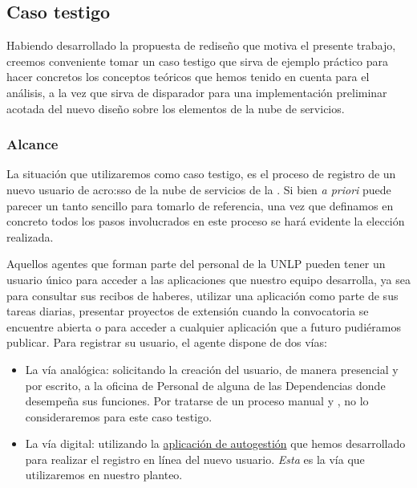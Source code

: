 \subsection{Caso testigo}
\label{caso-testigo}

Habiendo desarrollado la propuesta de rediseño que motiva el presente trabajo, creemos conveniente tomar un caso testigo que sirva de ejemplo práctico para hacer concretos los conceptos teóricos que hemos tenido en cuenta para el análisis, a la vez que sirva de disparador para una implementación preliminar acotada del nuevo diseño sobre los elementos de la nube de servicios.

\subsubsection{Alcance}

La situación que utilizaremos como caso testigo, es el proceso de registro de un nuevo usuario de \gls{acro:sso} de la nube de servicios de la {\unlp}. Si bien \textit{a priori} puede parecer un tanto sencillo para tomarlo de referencia, una vez que definamos en concreto todos los pasos involucrados en este proceso se hará evidente la elección realizada.

Aquellos agentes que forman parte del personal de la UNLP pueden tener un usuario único para acceder a las aplicaciones que nuestro equipo desarrolla, ya sea para consultar sus recibos de haberes, utilizar una aplicación como parte de sus tareas diarias, presentar proyectos de extensión cuando la convocatoria se encuentre abierta o para acceder a cualquier aplicación que a futuro pudiéramos publicar. Para registrar su usuario, el agente dispone de dos vías:

\begin{itemize}
  \item La vía analógica: solicitando la creación del usuario, de manera presencial y por escrito, a la oficina de Personal de alguna de las Dependencias donde desempeña sus funciones. Por tratarse de un proceso manual y , no lo consideraremos para este caso testigo.

  \item La vía digital: utilizando la \hyperref[anexo:detalle-clientes:sso]{aplicación de autogestión} que hemos desarrollado para realizar el registro en línea del nuevo usuario. \textit{Esta} es la vía que utilizaremos en nuestro planteo.
\end{itemize}

